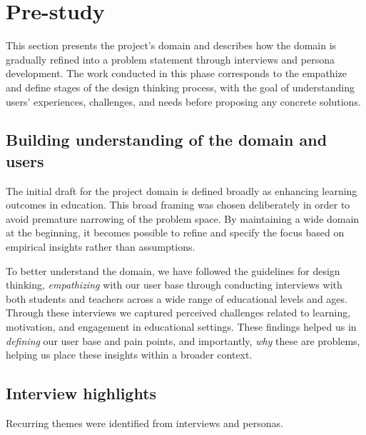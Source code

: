 \section{Pre-study}
This section presents the project’s domain and describes how the domain is gradually refined into a 
problem statement through interviews and persona development.
The work conducted in this phase corresponds to the empathize and define stages of the design thinking process\cite{DesignThinking},
with the goal of understanding users’ experiences, challenges, and needs before proposing any concrete solutions.

\subsection{Building understanding of the domain and users}
The initial draft for the project domain is defined broadly as enhancing learning outcomes in education. 
This broad framing was chosen deliberately in order to avoid premature narrowing of the problem space. 
By maintaining a wide domain at the beginning, it becomes possible to refine and specify the focus based 
on empirical insights rather than assumptions.

To better understand the domain, we have followed the guidelines for design thinking\cite{DesignThinking},
\textit{empathizing} with our user base through conducting interviews with both students and teachers across a wide range of
educational levels and ages.
Through these interviews we captured perceived challenges related to learning, motivation, and engagement in educational settings.
These findings helped us in \textit{defining} our user base and pain points, and importantly, \textit{why} these are problems,
helping us place these insights within a broader context.

\subsection{Interview highlights}\label{pre-study-interviews}

Recurring themes were identified from interviews and personas. %

